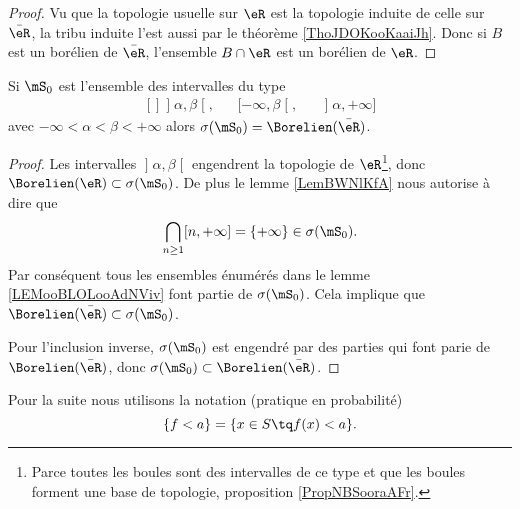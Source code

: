 \begin{proof}
    Vu que la topologie usuelle sur \( \eR\) est la topologie induite de celle sur \( \bar \eR\), la tribu induite l'est aussi par le théorème \ref{ThoJDOKooKaaiJh}. Donc si \( B\) est un borélien de \( \bar \eR\), l'ensemble \( B\cap \eR\) est un borélien de \( \eR\).
\end{proof}

\begin{lemma}       \label{LemooCRVJooQosHPq}
    Si \( \mS_0\) est l'ensemble des intervalles du type 
    \begin{equation}
        \begin{aligned}[]
        \mathopen] \alpha , \beta \mathclose[,&&\mathopen[ -\infty , \beta \mathclose[,&&\mathopen] \alpha , +\infty \mathclose]
        \end{aligned}
    \end{equation}
    avec \( -\infty<\alpha<\beta<+\infty\) alors \( \sigma(\mS_0)=\Borelien(\bar\eR)\).
\end{lemma}

\begin{proof}
Les intervalles \( \mathopen] \alpha , \beta \mathclose[\) engendrent la topologie de \( \eR\)\footnote{Parce toutes les boules sont des intervalles de ce type et que les boules forment une base de topologie, proposition \ref{PropNBSooraAFr}.}, donc \( \Borelien(\eR)\subset\sigma(\mS_0)\). De plus le lemme \ref{LemBWNlKfA} nous autorise à dire que 
    \begin{equation}
        \bigcap_{n\geq 1}\mathopen[ n , +\infty \mathclose]=\{ +\infty \}\in\sigma(\mS_0).
    \end{equation}
    Par conséquent tous les ensembles énumérés dans le lemme \ref{LEMooBLOLooAdNViv} font partie de \( \sigma(\mS_0)\). Cela implique que \( \Borelien(\bar\eR)\subset\sigma(\mS_0)\).

    Pour l'inclusion inverse, \( \sigma(\mS_0)\) est engendré par des parties qui font parie de \( \Borelien(\bar \eR)\), donc \( \sigma(\mS_0)\subset\Borelien(\bar \eR)\).
\end{proof}

Pour la suite nous utilisons la notation (pratique en probabilité)
\begin{equation}
    \{ f<a \}=\{ x\in S\tq f(x)<a \}.
\end{equation}

